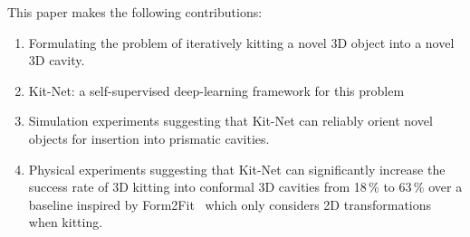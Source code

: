 
This paper makes the following contributions:
\begin{enumerate}%
\item Formulating the problem of iteratively kitting a novel 3D object into a novel 3D cavity.
\item Kit-Net: a self-supervised deep-learning framework for this problem 
\item Simulation experiments suggesting that Kit-Net can reliably orient novel objects for insertion into prismatic cavities. %
\item Physical experiments suggesting that Kit-Net can significantly increase the success rate of 3D kitting into conformal 3D cavities from 18\,\% to 63\,\% over a baseline inspired by Form2Fit~\cite{Zakka2020Form2FitLS} which only considers 2D transformations when kitting. %
\end{enumerate}


